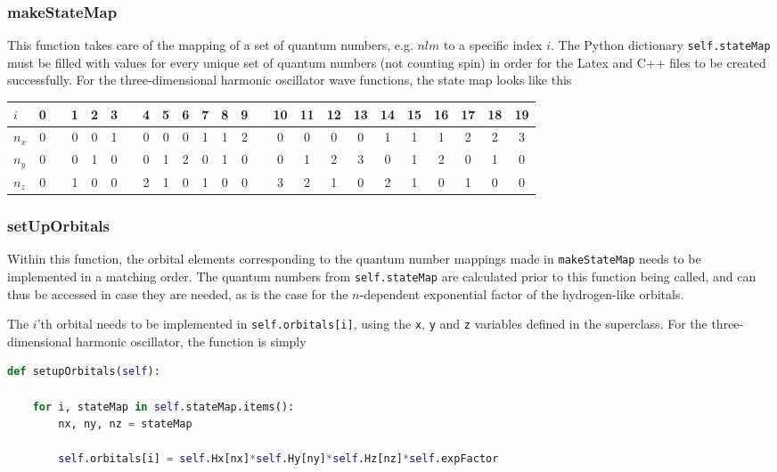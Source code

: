 \subsubsection{makeStateMap}

This function takes care of the mapping of a set of quantum numbers, e.g. $nlm$ to a specific index $i$. The Python dictionary \verb+self.stateMap+ must be filled with values for every unique set of quantum numbers (not counting spin) in order for the Latex and C++ files to be created successfully. For the three-dimensional harmonic oscillator wave functions, the state map looks like this

\begin{center}
\begin{tabular}{l|ccccccccccccccccccccccc}
$i$   &  0 & & 1 &  2 &  3 & & 4 &  5 &  6 &  7 &  8 &  9 & & 10 &  11 &  12 &  13 &  14 &  15 &  16 &  17 &  18 & 19 \\
\hline
$n_x$ &  0 & & 0 &  0 &  1 & & 0 &  0 &  0 &  1 &  1 &  2 & & 0 &  0 &  0 &  0 &  1 &  1 &  1 &  2 &  2 &  3 \\
$n_y$ &  0 & & 0 &  1 &  0 & & 0 &  1 &  2 &  0 &  1 &  0 & & 0 &  1 &  2 &  3 &  0 &  1 &  2 &  0 &  1 &  0 \\
$n_z$ &  0 & & 1 &  0 &  0 & & 2 &  1 &  0 &  1 &  0 &  0 & & 3 &  2 &  1 &  0 &  2 &  1 &  0 &  1 &  0 &  0 
\end{tabular}
\end{center}

\subsubsection{setUpOrbitals}

Within this function, the orbital elements corresponding to the quantum number mappings made in \verb+makeStateMap+ needs to be implemented in a matching order. The quantum numbers from \verb+self.stateMap+ are calculated prior to this function being called, and can thus be accessed in case they are needed, as is the case for the $n$-dependent exponential factor of the hydrogen-like orbitals.

The $i$'th orbital needs to be implemented in \verb+self.orbitals[i]+, using the \verb+x+, \verb+y+ and \verb+z+ variables defined in the superclass. For the three-dimensional harmonic oscillator, the function is simply

\vspace{0.25cm}
\begin{lstlisting}[language=Python, otherkeywords={self}]
def setupOrbitals(self):
      
    for i, stateMap in self.stateMap.items():
        nx, ny, nz = stateMap
        
        self.orbitals[i] = self.Hx[nx]*self.Hy[ny]*self.Hz[nz]*self.expFactor
  
\end{lstlisting}


